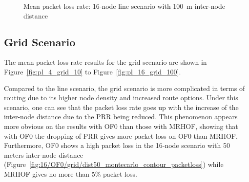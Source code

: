 \begin{figure}[p]
  \centering
    \leavevmode
  \caption{Mean packet loss rate: 16-node line scenario with 100~m inter-node distance}
  \label{fig:pl_16_line_100}
   \vspace{-20pt}
\end{figure}

\clearpage
\subsection{Grid Scenario}
\label{pl:grid}
The mean packet loss rate results for the grid scenario are shown in Figure~\ref{fig:pl_4_grid_10} to Figure~\ref{fig:pl_16_grid_100}.

Compared to the line scenario, the grid scenario is more complicated in terms of routing due to its higher node density and increased route options.  Under this scenario, one can see that the packet loss rate goes up with the increase of the inter-node distance due to the PRR being reduced. This phenomenon appears more obvious on the results with OF0 than those with MRHOF, showing that with OF0 the dropping of PRR gives more packet loss on OF0 than MRHOF. Furthermore, OF0 shows a high packet loss in the 16-node scenario with 50 meters inter-node distance (Figure~\ref{fig:16/OF0/grid/dist50_montecarlo_contour_packetloss}) while MRHOF gives no more than 5\% packet loss.

